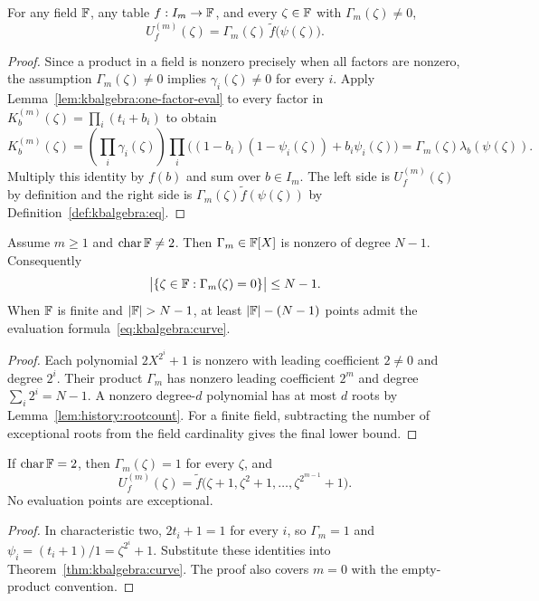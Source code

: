 \begin{theorem}\label{thm:kbalgebra:curve}
For any field $\mathbb{F}$, any table $f:I_m\to\mathbb{F}$, and every $\zeta\in\mathbb{F}$ with $\Gamma_m(\zeta)\neq0$,
\begin{equation}\label{eq:kbalgebra:curve}
 \boxed{U_f^{(m)}(\zeta)=\Gamma_m(\zeta)\,\widetilde f\bigl(\psi(\zeta)\bigr).}
\end{equation}
\end{theorem}
\begin{proof}
Since a product in a field is nonzero precisely when all factors are nonzero, the assumption $\Gamma_m(\zeta)\neq0$ implies $\gamma_i(\zeta)\neq0$ for every $i$. Apply Lemma~\ref{lem:kbalgebra:one-factor-eval} to every factor in $K_b^{(m)}(\zeta)=\prod_i(t_i+b_i)$ to obtain
\[
 K_b^{(m)}(\zeta)=\left(\prod_i\gamma_i(\zeta)\right)
 \prod_i\bigl((1-b_i)(1-\psi_i(\zeta))+b_i\psi_i(\zeta)\bigr)
 =\Gamma_m(\zeta)\lambda_b(\psi(\zeta)).
\]
Multiply this identity by $f(b)$ and sum over $b\in I_m$. The left side is $U_f^{(m)}(\zeta)$ by definition and the right side is $\Gamma_m(\zeta)\widetilde f(\psi(\zeta))$ by Definition~\ref{def:kbalgebra:eq}.
\end{proof}

\begin{proposition}\label{prop:kbalgebra:exceptional}
Assume $m\geq1$ and $\operatorname{char}\mathbb{F}\neq2$. Then $\Gamma_m\in\mathbb{F}[X]$ is nonzero of degree $N-1$. Consequently
\[
 \bigl|\{\zeta\in\mathbb{F}:\Gamma_m(\zeta)=0\}\bigr|\leq N-1.
\]
When $\mathbb{F}$ is finite and $|\F|>N-1$, at least $|\mathbb{F}|-(N-1)$ points admit the evaluation formula~\eqref{eq:kbalgebra:curve}.
\end{proposition}
\begin{proof}
Each polynomial $2X^{2^i}+1$ is nonzero with leading coefficient $2\neq0$ and degree $2^i$. Their product $\Gamma_m$ has nonzero leading coefficient $2^m$ and degree $\sum_i2^i=N-1$. A nonzero degree-$d$ polynomial has at most $d$ roots by Lemma~\ref{lem:history:rootcount}. For a finite field, subtracting the number of exceptional roots from the field cardinality gives the final lower bound.
\end{proof}

\begin{corollary}\label{cor:kbalgebra:char2-curve}
If $\operatorname{char}\mathbb{F}=2$, then $\Gamma_m(\zeta)=1$ for every $\zeta$, and
\begin{equation}\label{eq:kbalgebra:char2-curve}
 \boxed{U_f^{(m)}(\zeta)=\widetilde f\bigl(\zeta+1,\zeta^2+1,\ldots,\zeta^{2^{m-1}}+1\bigr).}
\end{equation}
No evaluation points are exceptional.
\end{corollary}
\begin{proof}
In characteristic two, $2t_i+1=1$ for every $i$, so $\Gamma_m=1$ and $\psi_i=(t_i+1)/1=\zeta^{2^i}+1$. Substitute these identities into Theorem~\ref{thm:kbalgebra:curve}. The proof also covers $m=0$ with the empty-product convention.
\end{proof}

